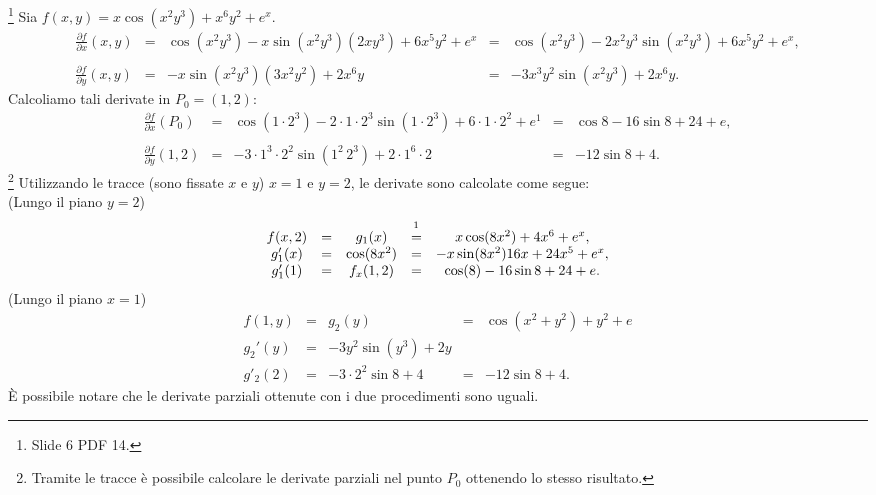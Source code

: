 \begin{example}\footnote{Slide 6 PDF 14.}
    Sia $f(x,y)=x\cos(x^2y^3)+x^6y^2+e^x$.
    \begin{equation}\label{eq:derivate_parziali_metodo_normale}
        \begin{matrix}
            \frac{\partial f}{\partial x}(x,y)&=& \cos(x^2y^3)-x\sin(x^2y^3)(2xy^3)+6x^5y^2+e^x&=&\cos(x^2y^3)-2x^2y^3\sin(x^2y^3)+6x^5y^2+e^x,\\\\
            \frac{\partial f}{\partial y}(x,y)&=& -x\sin(x^2y^3)(3x^2y^2)+2x^6y&=&-3x^3y^2\sin(x^2y^3)+2x^6y.
        \end{matrix}
    \end{equation}
    Calcoliamo tali derivate in $P_0=(1,2)$:
    \begin{equation*}
        \begin{matrix}
            \frac{\partial f}{\partial x}(P_0)&=& \cos(1\cdot 2^3)-2\cdot 1\cdot 2^3\sin(1\cdot 2^3)+6\cdot 1\cdot 2^2+e^1&=&\cos8 -16\sin8+24+ e,\\\\
            \frac{\partial f}{\partial y}(1,2)&=&-3\cdot 1^3\cdot 2^2\sin(1^2\,2^3)+2\cdot1^6\cdot2 &=&-12\sin8+4.
        \end{matrix}
    \end{equation*}
    \footnote{Tramite le tracce è possibile calcolare le derivate parziali nel punto $P_0$ ottenendo lo stesso risultato.}
    Utilizzando le tracce (sono fissate $x$ e $y$) $x=1$ e $y=2$, le  derivate sono calcolate come segue:\\
    (Lungo il piano $y=2$)
    \begin{equation*}
        \begin{matrix}
            f(x,2)&=&g_1(x)&\overset{\footnotemark}{=}&x\cos(8x^2)+4x^6+e^x,\\
            g'_1(x)&=&\cos(8x^2)&=&-x\sin(8x^2)16x+24x^5+e^x,\\
            g'_1(1)&=& f_x(1,2)&=& \cos(8)-16\sin8+24+e.
        \end{matrix}
    \end{equation*}
     (Lungo il piano  $x=1$)
    \begin{equation*}
        \begin{matrix}
            f(1,y) &=& g_2(y) &=& \cos(x^2+y^2)+y^2+e\\
            g_2'(y) &=& -3y^2\sin(y^3)+2y\\
            g'_2(2) &=& -3\cdot 2^2\sin 8+ 4 &=& -12\sin 8+4.
        \end{matrix}
    \end{equation*}
    È possibile notare che le derivate parziali ottenute con i due procedimenti sono uguali.
\end{example}
